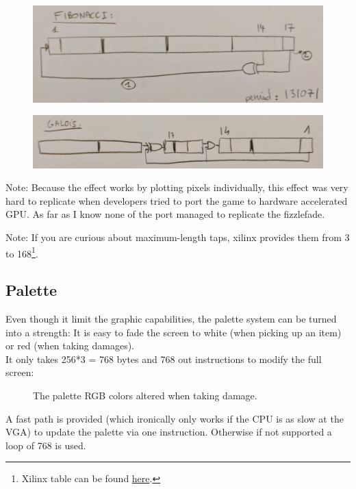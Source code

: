 \begin{figure}[H] \centering \includegraphics[width=\textwidth]{imgs/drawings/fizzlefade/fibonnaci.png} \end{figure}
\begin{figure}[H] \centering \includegraphics[width=\textwidth]{imgs/drawings/fizzlefade/galois.png} \end{figure}
      
Note: Because the effect works by plotting pixels individually, this effect was very hard to replicate when developers tried to port the game to hardware accelerated GPU. As far as I know none of the port managed to replicate the fizzlefade.

Note: If you are curious about maximum-length taps, xilinx provides them from 3 to 168\footnote{Xilinx table can be found \href{http://www.xilinx.com/support/documentation/application\_notes/xapp052.pdf}{here}.}.










\subsection{Palette}
Even though it limit the graphic capabilities, the palette system can be turned into a strength: It is easy to fade the screen to white (when picking up an item) or red (when taking damages).\\
It only takes 256*3 = 768 bytes and 768 out instructions to modify the full screen:
\begin{figure}[H]
  \centering
 \caption{The palette RGB colors altered when taking damage.} \label{fig:palette_damage}
\end{figure}
A fast path is provided (which ironically only works if the CPU is as slow at the VGA) to update the palette via one  instruction. Otherwise if not supported a loop of 768  is used.
\begin{minipage}{\linewidth}

\end{minipage}








